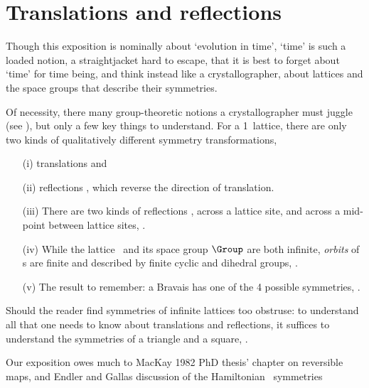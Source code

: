 

\section{Translations and reflections} %
\label{s:latt1d}
                                         \toCB

Though this exposition is nominally about `evolution in time', `time' is
such a loaded notion, a straightjacket hard to escape, that it is best to
forget about `time' for time being, and think instead like a
crystallographer, about lattices and the space groups that describe their
symmetries.

Of necessity, there many group-theoretic notions a crystallographer must
juggle (see ), but only a few key
things to understand.
For a 1\dmn\ lattice, there are only two kinds of qualitatively different
symmetry transformations,
\begin{itemize}
  \item[(i)]
translations 
and
  \item[(ii)]
reflections , which reverse the direction of translation.
  \item[(iii)]
There are two kinds of reflections , across a lattice site,
and across a mid-point between lattice sites, .
  \item[(iv)]
While the lattice \lattice\ and its space group $\Group$ are both
infinite, \emph{orbits} of {\lattstate}s are finite and described
by finite cyclic and dihedral groups, .
  \item[(v)]
The result to remember: a Bravais {\lattstate} has one of the
4 possible symmetries,
.

\end{itemize}
Should the reader find symmetries of infinite lattices too obstruse:
to understand all that one needs to know about translations  and
reflections, it suffices to understand the symmetries of a
triangle and a square, .

Our exposition owes much to MacKay 1982 PhD thesis' chapter on
reversible maps, and Endler and Gallas discussion of the Hamiltonian
\HenonMap\ symmetries


